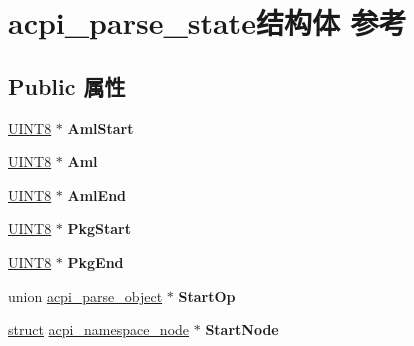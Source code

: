 \hypertarget{structacpi__parse__state}{}\section{acpi\+\_\+parse\+\_\+state结构体 参考}
\label{structacpi__parse__state}
\subsection*{Public 属性}
\begin{DoxyCompactItemize}
\item 
\mbox{\label{structacpi__parse__state_ae71cc9b76d90bcec6a2c93a62d4385a2}} 
\hyperlink{_processor_bind_8h_ab27e9918b538ce9d8ca692479b375b6a}{U\+I\+N\+T8} $\ast$ {\bfseries Aml\+Start}
\item 
\mbox{\label{structacpi__parse__state_aeb8b5e8c0d38734896e3535b204a4e87}} 
\hyperlink{_processor_bind_8h_ab27e9918b538ce9d8ca692479b375b6a}{U\+I\+N\+T8} $\ast$ {\bfseries Aml}
\item 
\mbox{\label{structacpi__parse__state_acf5242dfd878906fd36f495592763a35}} 
\hyperlink{_processor_bind_8h_ab27e9918b538ce9d8ca692479b375b6a}{U\+I\+N\+T8} $\ast$ {\bfseries Aml\+End}
\item 
\mbox{\label{structacpi__parse__state_a051728950fe4004c565c18fd9929953b}} 
\hyperlink{_processor_bind_8h_ab27e9918b538ce9d8ca692479b375b6a}{U\+I\+N\+T8} $\ast$ {\bfseries Pkg\+Start}
\item 
\mbox{\label{structacpi__parse__state_a7087b42d2c1144c2f250a751020b05d6}} 
\hyperlink{_processor_bind_8h_ab27e9918b538ce9d8ca692479b375b6a}{U\+I\+N\+T8} $\ast$ {\bfseries Pkg\+End}
\item 
\mbox{\label{structacpi__parse__state_a055f4bff5dfc10f26dbd22353b1e2d4f}} 
union \hyperlink{unionacpi__parse__object}{acpi\+\_\+parse\+\_\+object} $\ast$ {\bfseries Start\+Op}
\item 
\mbox{\label{structacpi__parse__state_adc908a614d5aec2773f3fd66b91a57e1}} 
\hyperlink{interfacestruct}{struct} \hyperlink{structacpi__namespace__node}{acpi\+\_\+namespace\+\_\+node} $\ast$ {\bfseries Start\+Node}

\end{DoxyCompactItemize}
